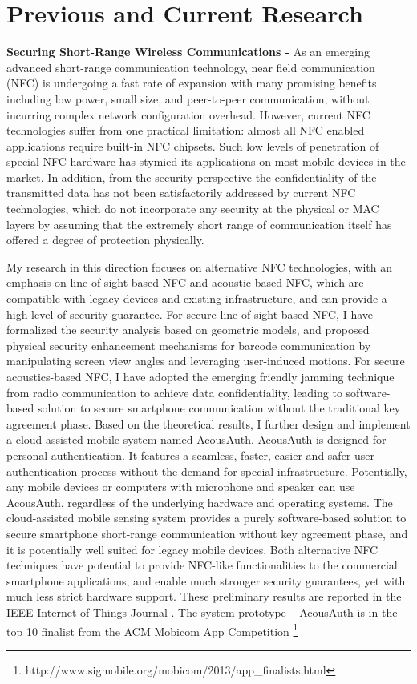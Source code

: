\documentclass[11pt]{article}
\begin{document}
\section*{Previous and Current Research}

\textbf{Securing Short-Range Wireless Communications -} As an emerging advanced short-range communication technology, near field communication (NFC) is undergoing a fast rate of expansion with many promising benefits including low power, small size, and peer-to-peer communication, without incurring complex network configuration overhead. However, current NFC technologies suffer from one practical limitation: almost all NFC enabled applications require built-in NFC chipsets. Such low levels of penetration of special NFC hardware has stymied its applications on most mobile devices in the market. In addition, from the security perspective the confidentiality of the transmitted data has not been satisfactorily addressed by current NFC technologies, which do not incorporate any security at the physical or MAC layers by assuming that the extremely short range of communication itself has offered a degree of protection physically. 

My research in this direction focuses on alternative NFC technologies, with an emphasis on line-of-sight based NFC and acoustic based NFC, which are compatible with legacy devices and existing infrastructure, and can provide a high level of security guarantee. For secure line-of-sight-based NFC, I have formalized the security analysis based on geometric models, and proposed physical security enhancement mechanisms for barcode communication by manipulating screen view angles and leveraging user-induced motions. For secure acoustics-based NFC, I have adopted the emerging friendly jamming technique from radio communication to achieve data confidentiality, leading to software-based solution to secure smartphone communication without the traditional key agreement phase. Based on the theoretical results, I further design and implement a cloud-assisted mobile system named AcousAuth. AcousAuth is designed for personal authentication. It features a seamless, faster, easier and safer user authentication process without the demand for special infrastructure. Potentially, any mobile devices or computers with microphone and speaker can use AcousAuth, regardless of the underlying hardware and operating systems. The cloud-assisted mobile sensing system provides a purely software-based solution to secure smartphone short-range communication without key agreement phase, and it is potentially well suited for legacy mobile devices. Both alternative NFC techniques have potential to provide NFC-like functionalities to the commercial smartphone applications, and enable much stronger security guarantees, yet with much less strict hardware support. These preliminary results are reported in the IEEE Internet of Things Journal \cite{IEEE}. The system prototype -- AcousAuth is in the top 10 finalist from the ACM Mobicom App Competition \footnote{http://www.sigmobile.org/mobicom/2013/app\_finalists.html}
\end{document}
